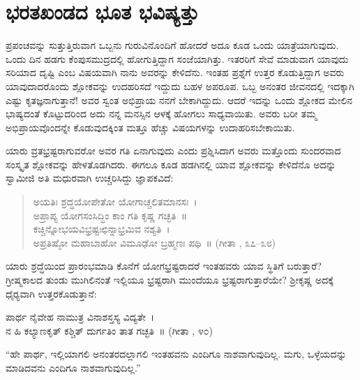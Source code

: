 \section*{ಭರತಖಂಡದ ಭೂತ ಭವಿಷ್ಯತ್ತು}

 ಪ್ರಪಂಚವನ್ನು ಸುತ್ತುತ್ತಿರುವಾಗ ಒಬ್ಬನು ಗುರುವಿನೊಂದಿಗೆ ಹೋದರೆ ಅದೂ ಕೂಡ ಒಂದು ಯಾತ್ರೆಯಾಗುವುದು. ಒಂದು ದಿನ ಹಡಗು ಕೆಂಪುಸಮುದ್ರದಲ್ಲಿ ಹೋಗುತ್ತಿದ್ದಾಗ ಸಂಜೆಯಾಗಿತ್ತು. ಇತರರಿಗೆ ಸೇವೆ ಮಾಡುವಾಗ ಯಾವುದು ಸರಿಯಾದ ದೃಷ್ಟಿ ಎಂಬ ವಿಷಯವಾಗಿ ನಾನು ಅವರನ್ನು ಕೇಳಿದೆನು. ಇಂತಹ ಪ್ರಶ್ನೆಗೆ ಉತ್ತರ ಕೊಡುತ್ತಿದ್ದಾಗ ಅವರು ಯಾವುದಾದರೊಂದು ಶ್ಲೋಕವನ್ನು ಉದಹರಿಸದೆ ಇದ್ದುದು ಬಹಳ ಅಪರೂಪ. ಒಬ್ಬ ಅನಂತರ ಜೀವನದಲ್ಲಿ ಇದಕ್ಕಾಗಿ ಎಷ್ಟು ಕೃತಜ್ಞನಾಗುತ್ತಾನೆ! ಅವರ ಸ್ವಂತ ಅಭಿಪ್ರಾಯ ನನಗೆ ಬೇಕಾಗಿದ್ದುದು. ಆದರೆ ಇದನ್ನು ಒಂದು ಶ್ಲೋಕದ ಮೇಲಿನ ಭಾಷ್ಯದಂತೆ ಕೊಟ್ಟುದರಿಂದ ಅದು ನನ್ನ ಮನಸ್ಸಿನ ಆಳಕ್ಕೆ ಹೋಗಲು ಸಾಧ್ಯವಾಯಿತು. ಅವರು ಬರೀ ತಮ್ಮ ಅಭಿಪ್ರಾಯವೊಂದನ್ನೇ ಕೊಡುವುದಕ್ಕಿಂತ ಮತ್ತೂ ಹೆಚ್ಚು ವಿಷಯಗಳನ್ನು ಉದಾಹರಿಸಬೇಕಾಯಿತು. 

 ಯಾರು ವ್ರತಭ್ರಷ್ಟರಾಗುವರೋ ಅವರ ಗತಿ ಏನಾಗುವುದು ಎಂದು ಪ್ರಶ್ನಿಸಿದಾಗ ಅವರು ಮತ್ತೊಂದು ಸುಂದರವಾದ ಸಂಸ್ಕೃತ ಶ್ಲೋಕವನ್ನು ಹೇಳತೊಡಗಿದರು. ಈಗಲೂ ಕೂಡ ಹಡಗಿನಲ್ಲಿ ಯಾವ ಶ್ಲೋಕವನ್ನು ಕೇಳಿದೆನೊ ಅದನ್ನು ಸ್ವಾಮೀಜಿ ಅತಿ ಮಧುರವಾಗಿ ಉಚ್ಚರಿಸಿದ್ದು ಜ್ಞಾಪಕವಿದೆ:

\begin{verse}
ಅಯತಿಃ ಶ್ರದ್ಧಯೋಪೇತೋ ಯೋಗಾಚ್ಚಲಿತಮಾನಸಃ~।\\ಅಪ್ರಾಪ್ಯ ಯೋಗಸಂಸಿದ್ಧಿಂ ಕಾಂ ಗತಿ ಕೃಷ್ಣ ಗಚ್ಛತಿ~॥\\ಕಚ್ಚಿನ್ನೋಭಯವಿಭ್ರಷ್ಟಃಛಿನ್ನಾಭ್ರಮಿವ ನಶ್ಯತಿ~।\\ಅಪ್ರತಿಷ್ಠೋ ಮಹಾಬಾಹೋ ವಿಮೂಢೋ ಬ್ರಹ್ಮಣಃ ಪಥಿ~॥ (ಗೀತಾ , ೩೭–೩೮)
\end{verse}

 ಯಾರು ಶ್ರದ್ಧೆಯಿಂದ ಪ್ರಾರಂಭಮಾಡಿ ಕೊನೆಗೆ ಯೋಗಭ್ರಷ್ಟರಾದರೆ ಇಂತಹವರು ಯಾವ ಸ್ಥಿತಿಗೆ ಬರುತ್ತಾರೆ? ಗ್ರೀಷ್ಮಕಾಲದ ತುಂಡು ಮುಗಿಲಿನಂತೆ ಇಲ್ಲಿಯೂ ಭ್ರಷ್ಟರಾಗಿ ಮುಂದೆಯೂ ಭ್ರಷ್ಟರಾಗುತ್ತಾರೆಯೇ? ಶ‍್ರೀಕೃಷ್ಣ ಅದಕ್ಕೆ ಧೈರ‍್ಯವಾಗಿ ಉತ್ತರಕೊಡುತ್ತಾನೆ: 

ಪಾರ್ಥ ನೈವೇಹ ನಾಮುತ್ರ ವಿನಾಶಸ್ತಸ್ಯ ವಿದ್ಯತೇ~। \\ನ ಹಿ ಕಲ್ಯಾಣಕೃತ್ ಕಶ್ಚಿತ್ ದುರ್ಗತಿಂ ತಾತ ಗಚ್ಛತಿ~॥ (ಗೀತಾ , ೪೦)

 “ಹೇ ಪಾರ್ಥ, ಇಲ್ಲಿಯಾಗಲಿ ಅನಂತರದಲ್ಲಾಗಲಿ ಇಂತಹವನು ಎಂದಿಗೂ ನಾಶವಾಗುವುದಿಲ್ಲ. ಮಗು, ಒಳ್ಳೆಯದನ್ನು ಮಾಡಿದವನು ಎಂದಿಗೂ ನಾಶವಾಗುವುದಿಲ್ಲ.” 

